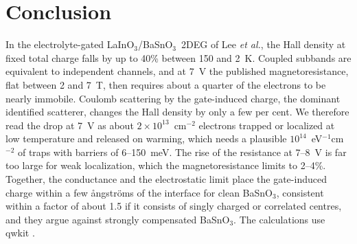 \documentclass[11pt]{article}
\newcommand{\LIO}{\texorpdfstring{LaInO$_3$}{LaInO3}}
\newcommand{\BSO}{\texorpdfstring{BaSnO$_3$}{BaSnO3}}
\begin{document}
\section{Conclusion}
In the electrolyte-gated \LIO/\BSO\ 2DEG of Lee \emph{et al.}, the Hall density at fixed total charge falls by up to 40\% between 150 and 2~K. Coupled subbands are equivalent to independent channels, and at 7~V the published magnetoresistance, flat between 2 and 7~T, then requires about a quarter of the electrons to be nearly immobile. Coulomb scattering by the gate-induced charge, the dominant identified scatterer, changes the Hall density by only a few per cent. We therefore read the drop at 7~V as about $2\times10^{13}$~cm$^{-2}$ electrons trapped or localized at low temperature and released on warming, which needs a plausible $10^{14}$~eV$^{-1}$cm$^{-2}$ of traps with barriers of 6--150~meV. The rise of the resistance at 7--8~V is far too large for weak localization, which the magnetoresistance limits to 2--4\%. Together, the conductance and the electrostatic limit place the gate-induced charge within a few \aa ngstr\"oms of the interface for clean \BSO, consistent within a factor of about 1.5 if it consists of singly charged or correlated centres, and they argue against strongly compensated \BSO. The calculations use qwkit \cite{qwkit}.



\end{document}
